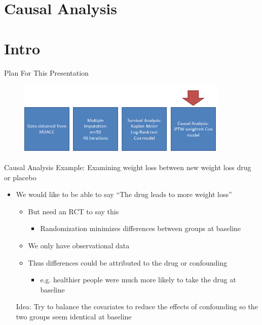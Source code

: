 \section{Causal Analysis}
\section{Intro}
\begin{frame}{Plan For This Presentation}
  \begin{figure}[h!]
  \centering
    \includegraphics[width=0.9\textwidth]{ps_flow}
\label{fig:ps_flow}
\end{figure} 
\end{frame}

\begin{frame}{Causal Analysis}
Example: Examining weight loss between new weight loss drug or placebo
 \begin{itemize}
  \item We would like to be able to say ``The drug leads to more weight loss''
  \begin{itemize}
   \item But need an RCT to say this
   \begin{itemize}
    \item Randomization minimizes differences between groups at baseline
   \end{itemize}

   \item We only have observational data
   \item Thus differences could be attributed to the drug or confounding
   
   \begin{itemize}
    \item e.g. healthier people were much more likely to take the drug at baseline
   \end{itemize}

  \end{itemize}
Idea: Try to balance the covariates to reduce the effects of confounding
so the two groups seem identical at baseline
 \end{itemize}
\end{frame}


